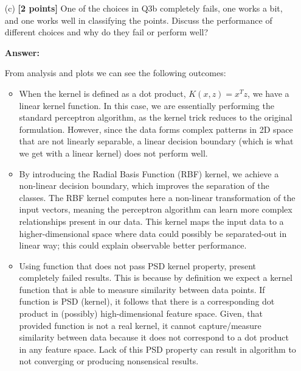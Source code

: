 \documentclass{article}
\begin{document}
\begin{enumerate}
  \item[(c)] \textbf{[2 points]} One of the choices in Q3b completely fails, one works a bit, and one works well in classifying the points. Discuss the performance of different choices and why do they fail or perform well?

  \textbf{Answer:}

  From analysis and plots we can see the following outcomes:

\begin{itemize}
    \item When the kernel is defined as a dot product, $K(x,z) = x^Tz$, we have a linear kernel function. In this case, we are essentially performing the standard perceptron algorithm, as the kernel trick reduces to the original formulation. However, since the data forms complex patterns in 2D space that are not linearly separable, a linear decision boundary (which is what we get with a linear kernel) does not perform well.
    \item By introducing the Radial Basis Function (RBF) kernel, we achieve a non-linear decision boundary, which improves the separation of the classes. The RBF kernel computes here a non-linear transformation of the input vectors, meaning the perceptron algorithm can learn more complex relationships present in our data. This kernel maps the input data to a higher-dimensional space where data  could possibly be separated-out in linear way; this could explain observable better performance.
    \item Using function that does not pass PSD kernel property, present completely failed results. This is because by definition we expect a kernel function that is able to measure similarity between data points. If function is PSD (kernel), it follows that there is a corresponding dot product in (possibly) high-dimensional  feature space. Given, that provided function is not a real kernel, it cannot capture/measure similarity between data because it does not correspond to a dot product in any feature space. Lack of this PSD property can result in algorithm to not converging or producing nonsensical results.
\end{itemize}
\end{enumerate}



    


\end{document}
